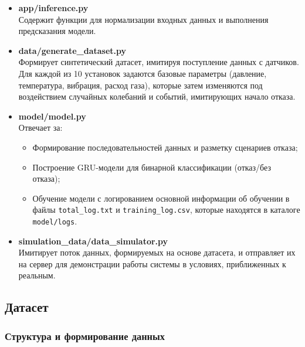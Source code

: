 \documentclass[a4paper,12pt]{article}
\begin{document}
\begin{flushleft}
\begin{itemize}
    \item \textbf{app/inference.py} \\
    Содержит функции для нормализации входных данных и выполнения предсказания модели.

    \item \textbf{data/generate\_dataset.py} \\
    Формирует синтетический датасет, имитируя поступление данных с датчиков. Для каждой из 10 установок задаются базовые параметры (давление, температура, вибрация, расход газа), которые затем изменяются под воздействием случайных колебаний и событий, имитирующих начало отказа.

    \item \textbf{model/model.py} \\
    Отвечает за:
    \begin{itemize}
        \item Формирование последовательностей данных и разметку сценариев отказа;
        \item Построение GRU-модели для бинарной классификации (отказ/без отказа);
        \item Обучение модели с логированием основной информации об обучении в файлы \texttt{total\_log.txt} и \texttt{training\_log.csv}, которые находятся в каталоге \texttt{model/logs}.
    \end{itemize}

    \item \textbf{simulation\_data/data\_simulator.py} \\
    Имитирует поток данных, формируемых на основе датасета, и отправляет их на сервер для демонстрации работы системы в условиях, приближенных к реальным.
\end{itemize}

\subsection{Датасет}

\subsubsection{Структура и формирование данных}


\end{flushleft}
\end{document}
